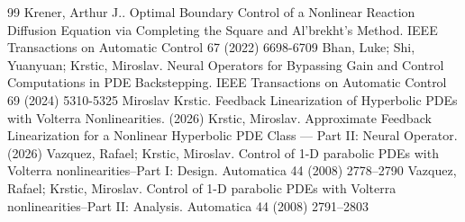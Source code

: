 \documentclass[10pt,a4paper]{amsart}
\begin{document}
\begin{thebibliography}{99}
 Krener, Arthur J.. Optimal Boundary Control of a Nonlinear Reaction Diffusion Equation via Completing the Square and Al’brekht’s Method. IEEE Transactions on Automatic Control 67 (2022) 6698-6709
 Bhan, Luke; Shi, Yuanyuan; Krstic, Miroslav. Neural Operators for Bypassing Gain and Control Computations in PDE Backstepping. IEEE Transactions on Automatic Control 69 (2024) 5310-5325
 Miroslav Krstic. Feedback Linearization of Hyperbolic PDEs with Volterra Nonlinearities. (2026)
 Krstic, Miroslav. Approximate Feedback Linearization for a Nonlinear Hyperbolic {PDE} Class --- {Part II}: Neural Operator. (2026)
 Vazquez, Rafael; Krstic, Miroslav. Control of 1-{D} parabolic {PDE}s with {V}olterra nonlinearities--{P}art {I}: Design. Automatica 44 (2008) 2778--2790
 Vazquez, Rafael; Krstic, Miroslav. Control of 1-{D} parabolic {PDE}s with {V}olterra nonlinearities--{P}art {II}: Analysis. Automatica 44 (2008) 2791--2803
\end{thebibliography}
\end{document}
